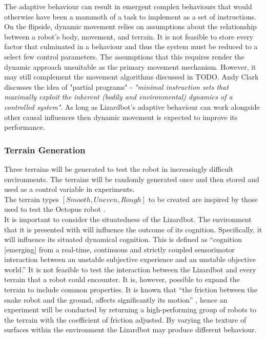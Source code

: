 \documentclass{article}
\begin{document}
The adaptive behaviour can result in emergent complex behaviours that would otherwise have been a mammoth of a task to implement as a set of instructions. On the flipside, dynamic movement relies on assumptions about the relationship between a robot's body, movement, and terrain. It is not feasible to store every factor that culminated in a behaviour and thus the system must be reduced to a select few control parameters. The assumptions that this requires render the dynamic approach unsuitable as the primary movement mechanism. However, it may still complement the movement algorithms discussed in TODO. Andy Clark discusses the idea of "partial programs"  - \textit{"minimal instruction sets that maximally exploit the inherent (bodily and environmental) dynamics of a controlled system"}.  As long as Lizardbot's adaptive behaviour can work alongside other causal influences then dynamic movement is expected to improve its performance.
 




\subsubsection{Terrain Generation}
Three terrains will be generated to test the robot in increasingly difficult environments. The terrains will be randomly generated once and then stored and used as a control variable in experiments.\\ 
The terrain types $[Smooth, Uneven, Rough]$ to be created are inspired by those used to test the Octopus robot .\\

It is important to consider the situatedness of the Lizardbot. The environment that it is presented with will influence the outcome of its cognition. Specifically, it will influence its situated dynamical cognition. This is defined as “cognition [emerging] from a real-time, continuous and strictly coupled sensorimotor interaction between an unstable subjective experience and an unstable objective world.” 
It is not feasible to test the interaction between the Lizardbot and every terrain that a robot could encounter. It is, however, possible to expand the terrain to include common properties. It is known that “the friction between the snake robot and the ground, affects significantly its motion” , hence an experiment will be conducted by returning a high-performing group of robots to the terrain with the coefficient of friction adjusted. By varying the texture of surfaces within the environment the Lizardbot may produce different behaviour. \\
\end{document}
